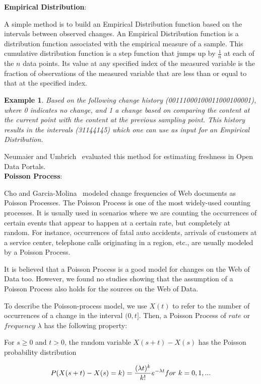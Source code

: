 \documentclass[sw]{iosart2x}
\newtheorem{example}{Example}
\begin{document}
\textbf{Empirical Distribution}: 

A simple method is to build an Empirical Distribution function based on the intervals between observed changes. An Empirical Distribution function is a distribution function associated with the empirical measure of a sample. This cumulative distribution function is a step function that jumps up by $ \frac{1}{n} $ at each of the $ n $ data points. Its value at any specified index of the measured variable is the fraction of observations of the measured variable that are less than or equal to that at the specified index.

\begin{example}
	\label{ex:ED}
	Based on the following change history (00111000100011000100001), where 0 indicates no change, and 1 a change based on comparing the content at the current point with the content at the previous sampling point. This history results in the intervals (31144145) which one can use as input for an Empirical Distribution.
\end{example}

Neumaier and Umbrich~\cite{NeumaierU16} evaluated this method for estimating freshness in Open Data Portals.\\

\textbf{Poisson Process}:

Cho and Garcia-Molina~\cite{ChoG00} modeled change frequencies of Web documents as Poisson Processes. The Poisson Process is one of the most widely-used counting processes. It is usually used in scenarios where we are counting the occurrences of certain events that appear to happen at a certain rate, but completely at random. For instance, occurrences of fatal auto accidents, arrivals of customers at a service center, telephone calls originating in a region, etc., are usually modeled by a Poisson Process. 

It is believed that a Poisson Process is a good model for changes on the Web of Data too. However, we found no studies showing that the assumption of a Poisson Process also holds for the sources on the Web of Data.

To describe the Poisson-process model, we use $X(t)$ to refer to the number of occurrences of a change in the interval $(0, t]$. Then, a Poisson Process of $rate$ or $frequency$ $\lambda$ has the following property:

For $s \geq 0$ and $t > 0$, the random variable $X(s + t) - X(s)$ has the Poisson probability distribution

\begin{equation}
\label{eq:Poisson}
P\\(X(s + t) - X(s) = k\\) = \frac{(\lambda t)^k}{k!}e^{-\lambda t} for~k=0,1,...
\end{equation}
\end{document}

